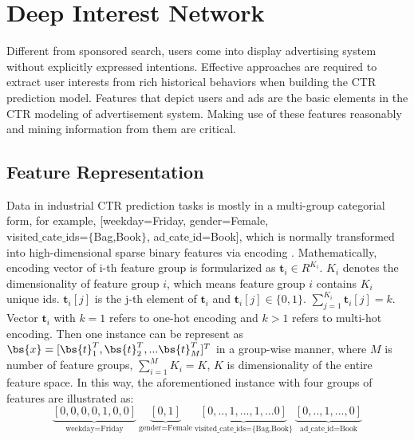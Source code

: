 \section{Deep Interest Network}\label{sec:opa}

Different from sponsored search, users come into display advertising system without explicitly expressed intentions. 
Effective approaches are required to extract user interests from rich historical behaviors when building the CTR prediction model. 
Features that depict users and ads are the basic elements in the CTR modeling of advertisement system. 
Making use of these features reasonably and mining information from them are critical.

\subsection{Feature Representation}
Data in industrial CTR prediction tasks is mostly in a multi-group categorial form, for example, [weekday=Friday, gender=Female, \\ visited$\_$cate$\_$ids=$\{$Bag,Book$\}$, ad$\_$cate$\_$id=Book],
which is normally transformed into high-dimensional sparse binary features via encoding \cite{deep_crossing,widedeep,ftrl}. 
Mathematically, encoding vector of i-th feature group is formularized as $\textbf{t}_i \in R^{K_i}$. $K_i$ denotes the dimensionality of feature group $i$, which means feature group $i$ contains $K_i$ unique ids. 
$\textbf{t}_i[j]$ is the j-th element of $\textbf{t}_i$  and $\textbf{t}_i[j] \in \{0,1\}$. $\sum_{j=1}^{K_i} \textbf{t}_i[j]=k$. 
Vector $\textbf{t}_i$ with $k=1$ refers to one-hot encoding and $k>1$ refers to multi-hot encoding. 
Then one instance can be represent as $\bs{x} = [\bs{t}_1^T, \bs{t}_2^T,...\bs{t}_M^T]^T$ in a group-wise manner, where $M$ is number of feature groups, $\sum_{i=1}^{M}K_i = K$, $K$ is dimensionality of the entire feature space. 
In this way, the aforementioned instance with four groups of features are illustrated as: 
\[
\underbrace{[0,0,0,0,1,0,0]}_{\text{weekday=Friday}} ~ \underbrace{[0,1]}_{\text{gender=Female}} ~ \underbrace{[0,..,1,...,1,...0]}_{\text{visited\_cate\_ids=\{Bag,Book\}}} 
~ \underbrace{[0,..,1,...,0]}_{\text{ad\_cate\_id=Book}}
\]

